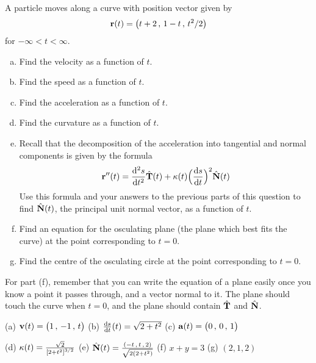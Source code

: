 \begin{question}[M317 2015A]  %
A particle moves along a curve with position vector given by
\begin{equation*}
\mathbf{r}(t) = \big(t + 2\,,\, 1 - t\,,\, t^2 /2\big)
\end{equation*}
for $-\infty < t < \infty$.

\begin{enumerate}[(a)]
\item
Find the velocity as a function of $t$.

\item
Find the speed as a function of $t$.

\item
Find the acceleration as a function of $t$.

\item
Find the curvature as a function of $t$.

\item
Recall that the decomposition of the acceleration into tangential and
normal components is given by the formula
\begin{equation*}
\vr''(t) = \difftwo{s}{t} \hat\vT(t) 
 + \kappa(t)\Big(\diff{s}{t}\Big)^2\hat\vN(t)
\end{equation*}
Use this formula and your answers to the previous parts of this 
question to find $\hat{\mathbf{N}}(t)$, the principal unit normal vector,
as a function of $t$.

\item
Find an equation for the osculating plane (the plane which best fits the curve) at the point corresponding to $t = 0$.

\item
Find the centre of the osculating circle at the point corresponding 
to $t = 0$.

\end{enumerate}
\end{question}

\begin{hint} 
For part (f), remember that you can write the equation of a plane easily once you know a point it passes through, and a vector normal to it. The plane should touch the curve when $t=0$, and the plane should contain $\hat{\mathbf{T}}$ and $\hat{\mathbf{N}}$.
\end{hint}

\begin{answer} 
(a) $\mathbf{v}(t) = \big(1\,,\, -1\,,\, t\big)$\qquad
(b) $\diff{s}{t}(t)=\sqrt{2+t^2}$\qquad
(c) $\mathbf{a}(t) =\big(0\,,\, 0\,,\, 1\big)$\

(d) $\kappa(t) = \frac{\sqrt{2}}{{[2+t^2]}^{3/2}}$\qquad
(e) $\hat{\mathbf{N}}(t) = \frac{(-t\,,\, t\,,\, 2)}{\sqrt{2(2+t^2)}}$\qquad
(f) $x+y = 3$\qquad
(g) $(2,1,2)$
\end{answer}

